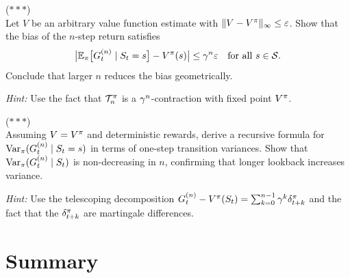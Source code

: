 \documentclass[11pt,a4paper]{article}
\begin{document}
\begin{exercise}
\textnormal{(\(***\))} \\
Let $V$ be an arbitrary value function estimate with
$\|V - V^{\pi}\|_\infty \leq \varepsilon$. Show that the bias of the
$n$-step return satisfies
\[
  \bigl|\mathbb{E}_\pi\bigl[G_t^{(n)} \mid S_t = s\bigr]
  - V^{\pi}(s)\bigr| \leq \gamma^n \varepsilon
  \quad \text{for all } s \in \mathcal{S}.
\]
Conclude that larger $n$ reduces the bias geometrically.

\textit{Hint:} Use the fact that $\mathcal{T}_n^\pi$ is a
$\gamma^n$-contraction with fixed point $V^{\pi}$.
\end{exercise}

\begin{exercise}
\textnormal{(\(***\))} \\
Assuming $V = V^{\pi}$ and deterministic rewards, derive a recursive
formula for $\operatorname{Var}_\pi(G_t^{(n)} \mid S_t = s)$ in terms of one-step
transition variances. Show that $\operatorname{Var}_\pi(G_t^{(n)} \mid S_t)$ is
non-decreasing in $n$, confirming that longer lookback increases
variance.

\textit{Hint:} Use the telescoping decomposition
$G_t^{(n)} - V^{\pi}(S_t) = \sum_{k=0}^{n-1} \gamma^k
\delta_{t+k}^\pi$ and the fact that the $\delta_{t+k}^\pi$
are martingale differences.
\end{exercise}

\section{Summary}
\label{sec:summary}
\end{document}
